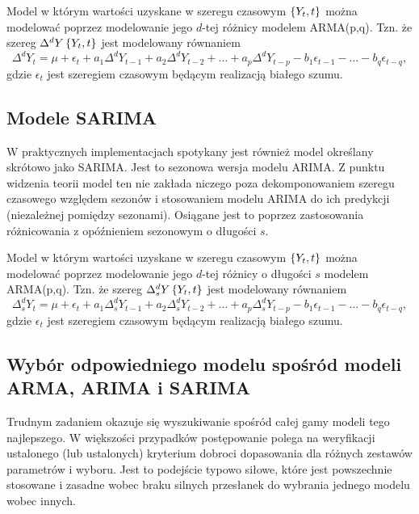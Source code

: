 \documentclass[10pt,a4paper]{book}
\begin{document}
\begin{definition} 
Model w którym wartości uzyskane w szeregu czasowym $\left\lbrace {{Y_t}, {t}} \right\rbrace$ można modelować poprzez modelowanie jego $d$-tej różnicy modelem ARMA(p,q). Tzn. że szereg $\Delta^d Y\left\lbrace {{Y_t}, {t}} \right\rbrace$ jest modelowany równaniem 
$$
\Delta^d Y_t = \mu + \epsilon_t + a_1 \Delta^d Y_{t-1} + a_2 \Delta^d Y_{t-2} + \ldots + a_p \Delta^d Y_{t-p} - b_1 \epsilon_{t-1} -\ldots - b_q \epsilon_{t-q} ,
$$
gdzie $\epsilon_t $ jest szeregiem czasowym będącym realizacją białego szumu.
\end{definition}

\subsection{Modele SARIMA}

W praktycznych implementacjach spotykany jest również model określany skrótowo jako SARIMA. Jest to sezonowa wersja modelu ARIMA. Z punktu widzenia teorii model ten nie zakłada niczego poza dekomponowaniem szeregu czasowego względem sezonów i stosowaniem modelu ARIMA do ich predykcji (niezależnej pomiędzy sezonami). Osiągane jest to poprzez zastosowania różnicowania z opóźnieniem sezonowym o długości $s$.

\begin{definition}
Model w którym wartości uzyskane w szeregu czasowym $\left\lbrace {{Y_t}, {t}} \right\rbrace$ można modelować poprzez modelowanie jego $d$-tej różnicy o długości $s$ modelem ARMA(p,q). Tzn. że szereg $\Delta^d_s Y\left\lbrace {{Y_t}, {t}} \right\rbrace$ jest modelowany równaniem 
$$
\Delta^d_s Y_t = \mu + \epsilon_t + a_1 \Delta^d_s Y_{t-1} + a_2 \Delta^d_s Y_{t-2} + \ldots + a_p \Delta^d_s Y_{t-p} - b_1 \epsilon_{t-1} -\ldots - b_q \epsilon_{t-q} ,
$$
gdzie $\epsilon_t $ jest szeregiem czasowym będącym realizacją białego szumu.
\end{definition}

\subsection{Wybór odpowiedniego modelu spośród modeli ARMA, ARIMA i SARIMA}

Trudnym zadaniem okazuje się wyszukiwanie spośród całej gamy modeli tego najlepszego. W większości przypadków postępowanie polega na weryfikacji ustalonego (lub ustalonych) kryterium dobroci dopasowania dla różnych zestawów parametrów i wyboru. Jest to podejście typowo siłowe, które jest powszechnie stosowane i zasadne wobec braku silnych przesłanek do wybrania jednego modelu wobec innych.
\end{document}
